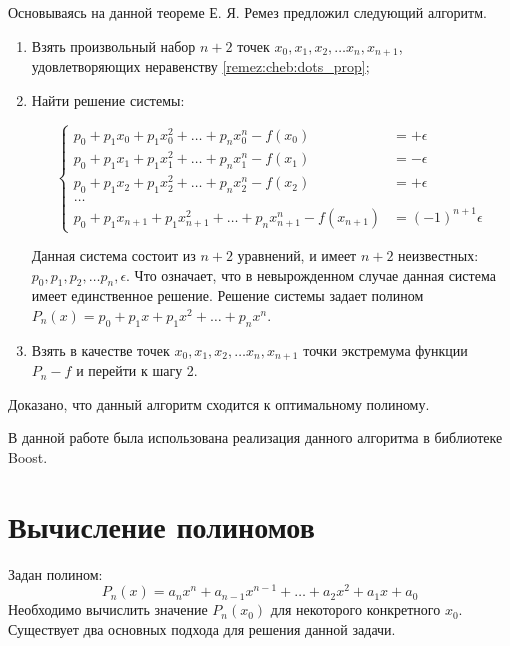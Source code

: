 Основываясь на данной теореме Е. Я. Ремез предложил следующий алгоритм.

\begin{enumerate}
    \item Взять произвольный набор $n+2$ точек $x_{0}, x_{1}, x_{2}, \ldots x_{n}, x_{n+1}$, удовлетворяющих неравенству \ref{remez:cheb:dots_prop};
    \item Найти решение системы:
    
    \begin{equation}
    \begin{cases}
        p_{0} + p_{1}x_{0} + p_{1}x_{0}^{2} +\ldots + p_{n}x_{0}^{n} - f(x_{0}) &= +\epsilon \\
        p_{0} + p_{1}x_{1} + p_{1}x_{1}^{2} +\ldots + p_{n}x_{1}^{n} - f(x_{1}) &= -\epsilon \\
        p_{0} + p_{1}x_{2} + p_{1}x_{2}^{2} +\ldots + p_{n}x_{2}^{n} - f(x_{2}) &= +\epsilon \\
        \ldots \\
        p_{0} + p_{1}x_{n+1} + p_{1}x_{n+1}^{2} +\ldots + p_{n}x_{n+1}^{n} - f(x_{n+1}) &= (-1)^{n+1}\epsilon
    \end{cases}    
    \end{equation}
    
    Данная система состоит из $n+2$ уравнений, и имеет $n+2$ неизвестных: $p_{0}, p_{1}, p_{2}, \ldots p_{n}, \epsilon$.
    Что означает, что в невырожденном случае данная система имеет единственное решение.
    Решение системы задает полином $P_n(x) = p_{0} + p_{1}x + p_{1}x^{2} +\ldots + p_{n}x^{n}$.
    
    \item Взять в качестве точек $x_{0}, x_{1}, x_{2}, \ldots x_{n}, x_{n+1}$ точки экстремума функции $P_{n} - f$ и перейти к шагу 2.
\end{enumerate}

Доказано, что данный алгоритм сходится к оптимальному полиному\cite{remez-proof}.

В данной работе была использована реализация данного алгоритма в библиотеке Boost\cite{remez-boost}.

\section{Вычисление полиномов}

Задан полином:
\begin{equation}
    P_{n}(x) = a_{n} x^n + a_{n-1} x^{n-1} + \ldots +
    a_2 x^2 + a_1 x + a_0
\end{equation}
Необходимо вычислить значение $P_{n}(x_0)$ для некоторого конкретного $x_0$.
Существует два основных подхода для решения данной задачи.


